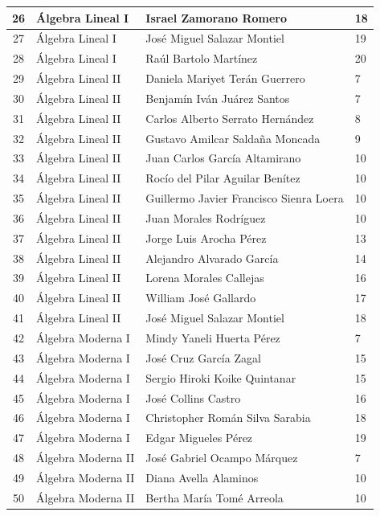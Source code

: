 {\begin{longtable}{|c|p{6.5cm}|p{5cm}|p{1.5cm}|}
26 & Álgebra Lineal I & Israel Zamorano Romero & 18 \\ \hline
27 & Álgebra Lineal I & José Miguel Salazar Montiel & 19 \\ \hline
28 & Álgebra Lineal I & Raúl Bartolo Martínez & 20 \\ \hline
29 & Álgebra Lineal II & Daniela Mariyet Terán Guerrero & 7 \\ \hline
30 & Álgebra Lineal II & Benjamín Iván Juárez Santos & 7 \\ \hline
31 & Álgebra Lineal II & Carlos Alberto Serrato Hernández & 8 \\ \hline
32 & Álgebra Lineal II & Gustavo Amilcar Saldaña Moncada & 9 \\ \hline
33 & Álgebra Lineal II & Juan Carlos García Altamirano & 10 \\ \hline
34 & Álgebra Lineal II & Rocío del Pilar Aguilar Benítez & 10 \\ \hline
35 & Álgebra Lineal II & Guillermo Javier Francisco Sienra Loera & 10 \\ \hline
36 & Álgebra Lineal II & Juan Morales Rodríguez & 10 \\ \hline
37 & Álgebra Lineal II & Jorge Luis Arocha Pérez & 13 \\ \hline
38 & Álgebra Lineal II & Alejandro Alvarado García & 14 \\ \hline
39 & Álgebra Lineal II & Lorena Morales Callejas & 16 \\ \hline
40 & Álgebra Lineal II & William José Gallardo & 17 \\ \hline
41 & Álgebra Lineal II & José Miguel Salazar Montiel & 18 \\ \hline
42 & Álgebra Moderna I & Mindy Yaneli Huerta Pérez & 7 \\ \hline
43 & Álgebra Moderna I & José Cruz García Zagal & 15 \\ \hline
44 & Álgebra Moderna I & Sergio Hiroki Koike Quintanar & 15 \\ \hline
45 & Álgebra Moderna I & José Collins Castro & 16 \\ \hline
46 & Álgebra Moderna I & Christopher Román Silva Sarabia & 18 \\ \hline
47 & Álgebra Moderna I & Edgar Migueles Pérez & 19 \\ \hline
48 & Álgebra Moderna II & José Gabriel Ocampo Márquez & 7 \\ \hline
49 & Álgebra Moderna II & Diana Avella Alaminos & 10 \\ \hline
50 & Álgebra Moderna II & Bertha María Tomé Arreola & 10 \\ \hline

\end{longtable}}
